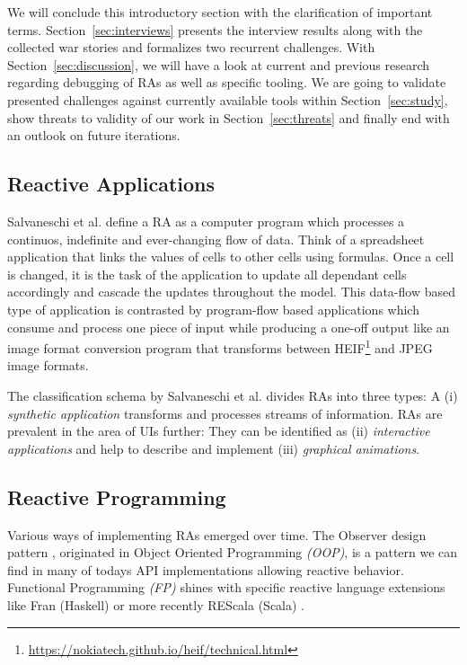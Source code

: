 \documentclass[12pt,a4paper]{article}
\begin{document}
We will conclude this introductory section with the clarification of important terms. Section~\ref{sec:interviews} presents the interview results along with the collected war stories and formalizes two recurrent challenges. With Section~\ref{sec:discussion}, we will have a look at current and previous research regarding debugging of RAs as well as specific tooling. We are going to validate presented challenges against currently available tools within Section~\ref{sec:study}, show threats to validity of our work in Section~\ref{sec:threats} and finally end with an outlook on future iterations.

\subsection{Reactive Applications}

Salvaneschi et al. \cite{7827078} define a RA as a computer program which processes a continuos, indefinite and ever-changing flow of data. Think of a spreadsheet application\cite{10.1145/2501654.2501666} that links the values of cells to other cells using formulas. Once a cell is changed, it is the task of the application to update all dependant cells accordingly and cascade the updates throughout the model. This data-flow based type of application is contrasted by program-flow based applications which consume and process one piece of input while producing a one-off output like an image format conversion program that transforms between HEIF\footnote{\url{https://nokiatech.github.io/heif/technical.html}} and JPEG image formats.

The classification schema by Salvaneschi et al. \cite{7827078} divides RAs into three types: A (i) \emph{synthetic application} transforms and processes streams of information. RAs are prevalent in the area of UIs further: They can be identified as (ii) \emph{interactive applications} and help to describe and implement (iii) \emph{graphical animations}.

\subsection{Reactive Programming}

Various ways of implementing RAs emerged over time. The Observer design pattern \cite{gamma1995design}, originated in Object Oriented Programming \emph{(OOP)}, is a pattern we can find in many of todays API implementations\cite{alabor:2019:reactiveappllications} allowing reactive behavior. Functional Programming \emph{(FP)} shines with specific reactive language extensions like Fran (Haskell) \cite{10.1145/2501654.2501666} or more recently REScala (Scala) \cite{10.1145/2577080.2577083}.
\end{document}
